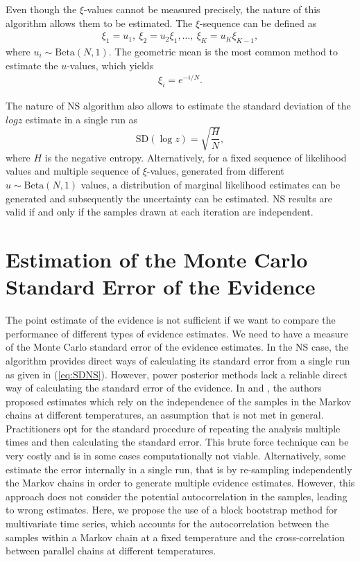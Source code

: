 \documentclass[aps,reprint,amsmath,amssymb,showpacs,showkeys]{revtex4-1}%
\begin{document}
Even though the $\xi$-values cannot be measured precisely, the nature of this algorithm allows them to be estimated. 
The $\xi$-sequence can be defined as 
\begin{align*}
\xi_1 = u_1,\: \xi_2 = u_2 \xi_1, \dots,\: \xi_K = u_K \xi_{K-1},
\end{align*}
where $u_i\sim\text{Beta}(N,1)$.  The geometric mean is the most common method to estimate the $u$-values, which yields
\begin{align*}
\xi_i = e^{-i/N}.
\end{align*}

The nature of NS algorithm also allows to estimate the standard deviation of the $log z$ estimate in a single run as 
\begin{equation}\label{eq:SDNS}
\text{SD}(\log z) = \sqrt{\dfrac{H}{N}},
\end{equation}
where $H$ is the negative entropy.  Alternatively, for a fixed sequence of likelihood values and multiple sequence of $\xi$-values, generated from different  $u\!\sim\!\text{Beta}(N,1)$ values, a distribution of marginal likelihood estimates can be generated and subsequently the uncertainty can be estimated.  NS results are valid if and only if the samples drawn at each iteration are independent.

\bigskip


\section{Estimation of the Monte Carlo Standard Error of the Evidence}
The point estimate of the evidence  is not sufficient if we want to compare the  performance of different types of evidence estimates.   We
need  to have a measure of the Monte Carlo standard error of the evidence estimates.  In the NS case, the algorithm provides direct ways of calculating its standard error from  a single run as given in (\ref{eq:SDNS}).  However, power posterior methods lack a reliable direct way of calculating the standard error of the evidence.  In \cite{Lartillot:Philippe:2006} and \cite{Xie:Lewis:Fan:Kuo:Chen:2011}, the authors proposed estimates which rely on the  independence of the samples in the Markov chains at different temperatures, an assumption that is not met  in general.  Practitioners opt for the standard procedure of repeating the analysis multiple times and then calculating the standard error.  This brute force technique can be very costly and is in some cases computationally not viable.  Alternatively, some estimate the error internally in a single run, that is by re-sampling independently the Markov chains in order to generate multiple evidence estimates.  However, this approach does not consider the potential autocorrelation in the samples, leading to wrong estimates.  Here, we propose the use of a block bootstrap method for multivariate time series, which accounts for  the autocorrelation between the samples within a Markov chain at a fixed
temperature and the cross-correlation between parallel chains at different temperatures.
	
\end{document}
